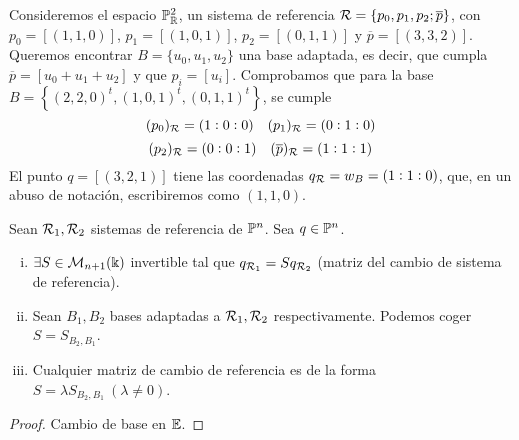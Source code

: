 \begin{example}
    Consideremos el espacio $\mathbb{P}^2_{\mathbb{R}}$, un sistema de referencia $\mathcal{R} = \{ p_0, p_1, p_2; \overline{p}\}$, con
    $p_0 = [(1, 1, 0)]$, $p_1 = [(1, 0, 1)]$, $p_2 = [(0, 1, 1)]$ y $\overline{p} = [(3,3,2)]$.
    Queremos encontrar $B = \{u_0, u_1, u_2\}$ una base adaptada, es decir, que cumpla $\overline{p} = [u_0+u_1+u_2]$
    y que $p_i = [u_i]$. Comprobamos que para la base $B = \left \{ (2,2,0)^t, (1,0,1)^t, (0,1,1)^t \right \}$, se cumple
    \[(p_0)_{\mathcal{R}} = (1:0:0) \quad (p_1)_{\mathcal{R}} = (0:1:0)\]
    \[(p_2)_{\mathcal{R}} = (0:0:1) \quad (\overline{p})_{\mathcal{R}} = (1:1:1)\]
    El punto $q = [(3, 2, 1)]$ tiene las coordenadas $q_{\mathcal{R}} = w_B = (1:1:0)$, que, en un abuso de notación,
    escribiremos como $(1, 1, 0)$.
\end{example}
\begin{prop}
    Sean $\mathcal{R}_1, \mathcal{R}_2$ sistemas de referencia de $\mathbb{P}^n$. Sea $q \in \mathbb{P}^n$.
    \begin{enumerate}[i)]
        \item $\exists S \in \mathcal{M}_{n+1}(\Bbbk)$ invertible tal que $q_{\mathcal{R}_1} = S q_{\mathcal{R}_2}$
        (matriz del cambio de sistema de referencia).
        \item Sean $B_1, B_2$ bases adaptadas a $\mathcal{R}_1, \mathcal{R}_2$ respectivamente. Podemos coger $S=S_{B_2, B_1}$.
        \item Cualquier matriz de cambio de referencia es de la forma $S=\lambda S_{B_2, B_1} \ (\lambda \neq 0)$.
    \end{enumerate}
\end{prop}
\begin{proof}
    Cambio de base en $\mathbb{E}$.
\end{proof}
